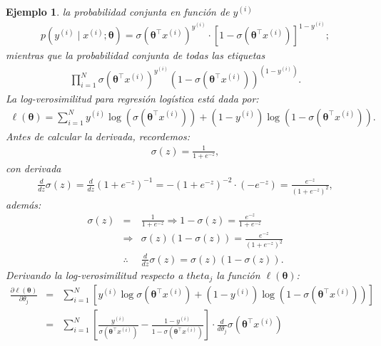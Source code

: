 \documentclass[12pt]{article}
\newtheorem{Ejem}{Ejemplo}%
\begin{document}
\begin{Ejem}
la probabilidad conjunta en función de $y^{(i)}$
\begin{eqnarray*}
p\left(y^{(i)} \mid x^{(i)}; \boldsymbol{\theta} \right) = 
\sigma(\boldsymbol{\theta}^{\top} x^{(i)})^{y^{(i)}} \cdot \left[1 - \sigma(\boldsymbol{\theta}^{\top} x^{(i)}) \right]^{1 - y^{(i)}};
\end{eqnarray*}
mientras que la probabilidad conjunta de todas las etiquetas
\begin{eqnarray*}
\prod_{i=1}^{N} \sigma(\boldsymbol{\theta}^{\top} x^{(i)})^{y^{(i)}} \left(1 - \sigma(\boldsymbol{\theta}^{\top} x^{(i)}) \right)^{(1 - y^{(i)})}.
\end{eqnarray*}
La log-verosimilitud para regresión logística está dada por:
\begin{eqnarray*}
\ell(\boldsymbol{\theta}) = \sum_{i=1}^{N} y^{(i)} \log \left( \sigma(\boldsymbol{\theta}^{\top} x^{(i)}) \right) + 
(1 - y^{(i)}) \log \left( 1 - \sigma(\boldsymbol{\theta}^{\top} x^{(i)}) \right).
\end{eqnarray*}
Antes de calcular la derivada, recordemos:
\begin{eqnarray*}
\sigma(z) = \frac{1}{1 + e^{-z}},
\end{eqnarray*}
con derivada
\begin{eqnarray*}
\frac{d}{dz} \sigma(z) = \frac{d}{dz} \left(1 + e^{-z} \right)^{-1} = 
-(1 + e^{-z})^{-2} \cdot (-e^{-z}) =
\frac{e^{-z}}{(1 + e^{-z})^2},
\end{eqnarray*}
además:
\begin{eqnarray*}
\sigma(z) &=& \frac{1}{1 + e^{-z}} \Rightarrow 1 - \sigma(z) = \frac{e^{-z}}{1 + e^{-z}}\\
&\Rightarrow& \sigma(z)(1 - \sigma(z)) = \frac{e^{-z}}{(1 + e^{-z})^2}\\
&\therefore& \frac{d}{dz} \sigma(z) = \sigma(z)(1 - \sigma(z)).
\end{eqnarray*}
Derivando la log-verosimilitud respecto a $theta_{j}$ la función $\ell(\boldsymbol{\theta})$:
\begin{eqnarray*}
\frac{\partial \ell(\boldsymbol{\theta})}{\partial \theta_j} &=& 
\sum_{i=1}^{N} \left[ y^{(i)} \log \sigma(\boldsymbol{\theta}^{\top} x^{(i)}) +
(1 - y^{(i)}) \log (1 - \sigma(\boldsymbol{\theta}^{\top} x^{(i)})) \right]\\
&=& \sum_{i=1}^{N} \left[ \frac{y^{(i)}}{\sigma(\boldsymbol{\theta}^{\top} x^{(i)})} 
- \frac{1 - y^{(i)}}{1 - \sigma(\boldsymbol{\theta}^{\top} x^{(i)})} \right]
\cdot \frac{d}{d\theta_j} \sigma(\boldsymbol{\theta}^{\top} x^{(i)})\\

\end{eqnarray*}
\end{Ejem}
\end{document}
